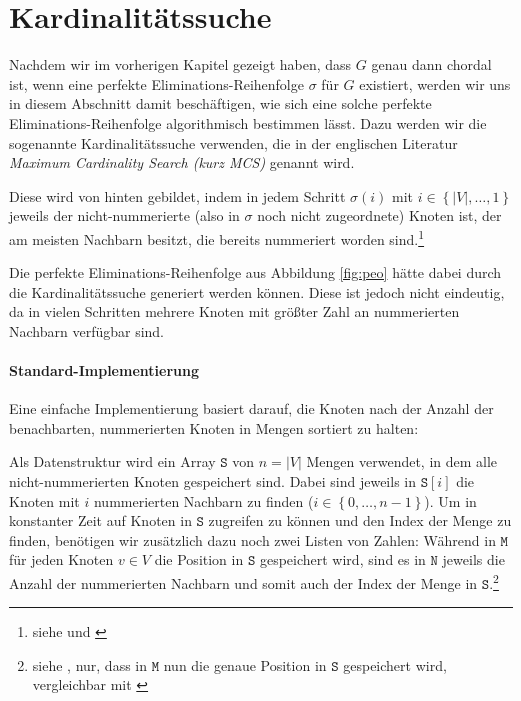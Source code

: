 \section{Kardinalitätssuche}
\label{section:mcs}
Nachdem wir im vorherigen Kapitel gezeigt haben, dass \( G \) genau dann chordal ist, wenn eine perfekte Eliminations-Reihenfolge \( \sigma \) für \( G \) existiert, werden wir uns in diesem Abschnitt damit beschäftigen, wie sich eine solche perfekte Eliminations-Reihenfolge algorithmisch bestimmen lässt. Dazu werden wir die sogenannte Kardinalitätssuche verwenden, die in der englischen Literatur \textit{Maximum Cardinality Search (kurz MCS)} genannt wird.

Diese wird \glqq{}von hinten\grqq{} gebildet, indem in jedem Schritt \( \sigma \left( i \right) \) mit \( i \in \left\lbrace \left| V \right|, \ldots, 1 \right\rbrace \) jeweils der nicht-nummerierte (also in \( \sigma \) noch nicht zugeordnete) Knoten ist, der am meisten Nachbarn besitzt, die bereits nummeriert worden sind.\footnote{siehe \cite[Kapitel 4.3]{golumbic} und \cite[2.1]{sankardeep}}

Die perfekte Eliminations-Reihenfolge aus Abbildung \ref{fig:peo} hätte dabei durch die Kardinalitätssuche generiert werden können. Diese ist jedoch nicht eindeutig, da in vielen Schritten mehrere Knoten mit größter Zahl an nummerierten Nachbarn verfügbar sind.

\paragraph{Standard-Implementierung} Eine einfache Implementierung basiert darauf, die Knoten nach der Anzahl der benachbarten, nummerierten Knoten in Mengen sortiert zu halten:

Als Datenstruktur wird ein Array \( \texttt{S} \) von \( n = \left| V \right| \) Mengen verwendet, in dem alle nicht-num\-mer\-ier\-ten Knoten gespeichert sind. Dabei sind jeweils in \( \texttt{S} \left[ i \right] \) die Knoten mit \( i \) nummerierten Nachbarn zu finden (\( i \in \left\lbrace 0, \ldots, n - 1 \right\rbrace \)). Um in konstanter Zeit auf Knoten in \( \texttt{S} \) zugreifen zu können und den Index der Menge zu finden, benötigen wir zusätzlich dazu noch zwei Listen von Zahlen: Während in \( \texttt{M} \) für jeden Knoten \( v \in V \) die Position in \( \texttt{S} \) gespeichert wird, sind es in \( \texttt{N} \) jeweils die Anzahl der nummerierten Nachbarn und somit auch der Index der Menge in \( \texttt{S} \).\footnote{siehe \cite[Abschnitt 2, Algorithmus Maximum Cardinality Search]{tarjanyannakakis}, nur, dass in \( \texttt{M} \) nun die genaue Position in \( \texttt{S} \) gespeichert wird, vergleichbar mit \cite[Abschnitt 2]{sankardeep}}

